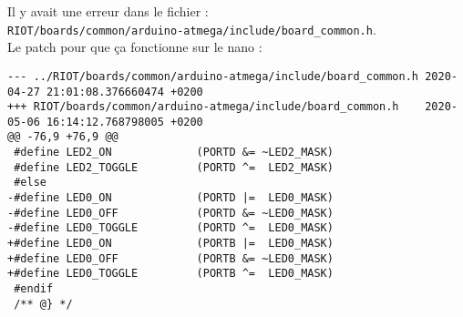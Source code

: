 Il y avait une erreur dans le fichier :\\
\texttt{RIOT/boards/common/arduino-atmega/include/board\_common.h}.\\

Le patch pour que ça fonctionne sur le nano :
\begin{lstlisting}
--- ../RIOT/boards/common/arduino-atmega/include/board_common.h	2020-04-27 21:01:08.376660474 +0200
+++ RIOT/boards/common/arduino-atmega/include/board_common.h	2020-05-06 16:14:12.768798005 +0200
@@ -76,9 +76,9 @@
 #define LED2_ON             (PORTD &= ~LED2_MASK)
 #define LED2_TOGGLE         (PORTD ^=  LED2_MASK)
 #else
-#define LED0_ON             (PORTD |=  LED0_MASK)
-#define LED0_OFF            (PORTD &= ~LED0_MASK)
-#define LED0_TOGGLE         (PORTD ^=  LED0_MASK)
+#define LED0_ON             (PORTB |=  LED0_MASK)
+#define LED0_OFF            (PORTB &= ~LED0_MASK)
+#define LED0_TOGGLE         (PORTB ^=  LED0_MASK)
 #endif
 /** @} */
\end{lstlisting}
